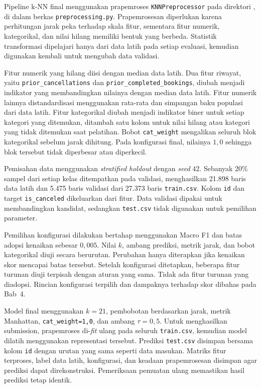 Pipeline k-NN final menggunakan prapemroses \texttt{KNNPreprocessor} pada direktori , di dalam berkas \texttt{preprocessing.py}. Prapemrosesan diperlukan karena perhitungan jarak peka terhadap skala fitur, sementara fitur numerik, kategorikal, dan nilai hilang memiliki bentuk yang berbeda. Statistik transformasi dipelajari hanya dari data latih pada setiap evaluasi, kemudian digunakan kembali untuk mengubah data validasi.

Fitur numerik yang hilang diisi dengan median data latih. Dua fitur riwayat, yaitu \texttt{prior\_cancellations} dan \texttt{prior\_completed\_bookings}, diubah menjadi indikator yang membandingkan nilainya dengan median data latih. Fitur numerik lainnya distandardisasi menggunakan rata-rata dan simpangan baku populasi dari data latih. Fitur kategorikal diubah menjadi indikator biner untuk setiap kategori yang ditemukan, ditambah satu kolom untuk nilai hilang atau kategori yang tidak ditemukan saat pelatihan. Bobot \texttt{cat\_weight} mengalikan seluruh blok kategorikal sebelum jarak dihitung. Pada konfigurasi final, nilainya $1{,}0$ sehingga blok tersebut tidak diperbesar atau diperkecil.

Pemisahan data menggunakan \textit{stratified holdout} dengan \textit{seed} 42. Sebanyak 20\% sampel dari setiap kelas ditempatkan pada validasi, menghasilkan 21.898 baris data latih dan 5.475 baris validasi dari 27.373 baris \texttt{train.csv}. Kolom \texttt{id} dan target \texttt{is\_canceled} dikeluarkan dari fitur. Data validasi dipakai untuk membandingkan kandidat, sedangkan \texttt{test.csv} tidak digunakan untuk pemilihan parameter.

Pemilihan konfigurasi dilakukan bertahap menggunakan Macro F1 dan batas adopsi kenaikan sebesar $0{,}005$. Nilai $k$, ambang prediksi, metrik jarak, dan bobot kategorikal diuji secara berurutan. Perubahan hanya diterapkan jika kenaikan skor mencapai batas tersebut. Setelah konfigurasi ditetapkan, beberapa fitur turunan diuji terpisah dengan aturan yang sama. Tidak ada fitur turunan yang diadopsi. Rincian konfigurasi terpilih dan dampaknya terhadap skor dibahas pada Bab~4.

Model final menggunakan $k=21$, pembobotan berdasarkan jarak, metrik Manhattan, \texttt{cat\_weight=1{,}0}, dan ambang $\tau=0{,}5$. Untuk menghasilkan submission, prapemroses di-\textit{fit} ulang pada seluruh \texttt{train.csv}, kemudian model dilatih menggunakan representasi tersebut. Prediksi \texttt{test.csv} disimpan bersama kolom \texttt{id} dengan urutan yang sama seperti data masukan. Matriks fitur terproses, label data latih, konfigurasi, dan keadaan prapemrosesan disimpan agar prediksi dapat direkonstruksi. Pemeriksaan pemuatan ulang memastikan hasil prediksi tetap identik.


